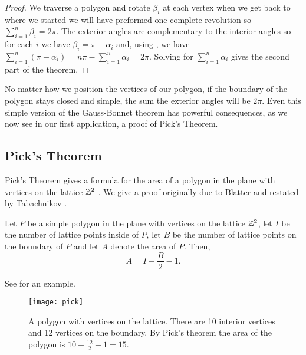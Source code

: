 \begin{proof}

	We traverse a polygon and rotate $\beta_i$ at each vertex
	when we get back to where we started we will have preformed 
	one complete revolution so $\sum_{i=1}^n\beta_i=2\pi.$
	The exterior angles are complementary to the interior angles
	so for each $i$ we have $\beta_i=\pi-\alpha_i$  and, using ,
	  we have
	$\sum_{i=1}^n(\pi-\alpha_i)=n\pi -\sum_{i=1}^n\alpha_i=2\pi$. 
	Solving for $\sum_{i=1}^n\alpha_i$ gives the second part of the theorem.

\end{proof}
No matter how we position the vertices of our polygon,
if the boundary of the polygon stays closed and simple,
the sum the exterior angles will be $2\pi$.
Even this simple version of the Gauss-Bonnet theorem has powerful
consequences, as we now see in our first application, a proof of Pick's Theorem.



\subsection{Pick's Theorem}
\label{sec:pick}

Pick's Theorem gives a formula for the area of a polygon
in the plane with vertices on the lattice $\mathbb{Z}^2$ \cite{og-pick}.
We give a proof originally due to Blatter \cite{blatter_another_1997}
and restated by Tabachnikov  \cite{tabachnikov_proofs_2014}.

\begin{theorem}\label{thm:pick}
Let $P$ be a simple polygon in the plane with vertices on the lattice $\mathbb{Z}^2$,
let $I$ be the number of lattice points inside of $P$, let $B$ be the number
of lattice points on the boundary of $P$ and let $A$ denote the area of $P$.
Then, 
$$A=I+\frac{B}{2}-1.$$
\end{theorem}
See  for an example.

 \begin{figure}[htb]
         \centering
         \texttt{[image: pick]}
	\caption{A polygon with vertices on the lattice. 
	There are 10 interior vertices and 12 vertices on the boundary.
	By Pick's theorem the area of the polygon is $10+\frac{12}{2}-1=15.$
	\label{fig:picks}}
 \end{figure}
 
